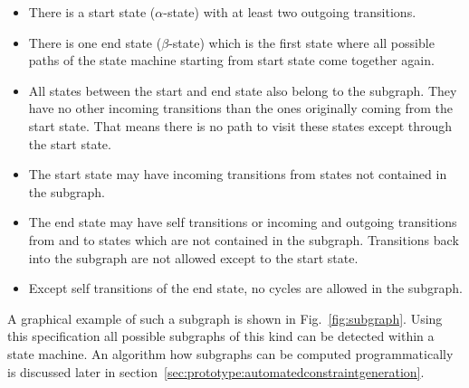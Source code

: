 \begin{itemize}
	\item There is a start state ($\alpha$-state) with at least two outgoing transitions.
	\item There is one end state ($\beta$-state) which is the first state where all possible paths of the state machine starting from start state come together again.
	\item All states between the start and end state also belong to the subgraph. They have no other incoming transitions than the ones originally coming from the start state. That means there is no path to visit these states except through the start state.
	\item The start state may have incoming transitions from states not contained in the subgraph.
	\item The end state may have self transitions or incoming and outgoing transitions from and to states which are not contained in the subgraph. Transitions back into the subgraph are not allowed except to the start state.
	\item Except self transitions of the end state, no cycles are allowed in the subgraph.
\end{itemize}

A graphical example of such a subgraph is shown in Fig.~\ref{fig:subgraph}. Using this specification all possible subgraphs of this kind can be detected within a state machine. An algorithm how subgraphs can be computed programmatically is discussed later in section~\ref{sec:prototype:automatedconstraintgeneration}.

